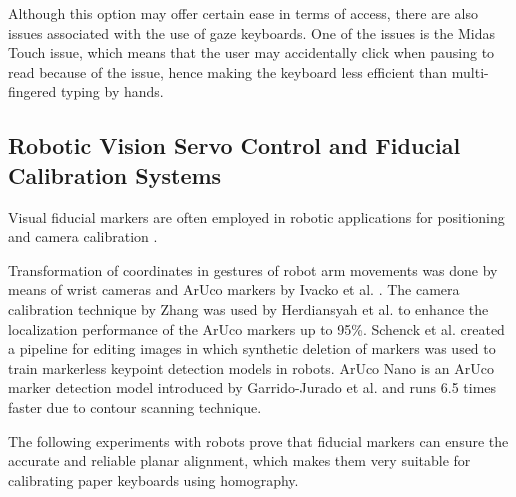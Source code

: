 Although this option may offer certain ease in terms of access, there are also issues associated with the use of gaze keyboards. One of the issues is the Midas Touch issue, which means that the user may accidentally click when pausing to read because of the issue, hence making the keyboard less efficient than multi-fingered typing by hands.

\subsection{Robotic Vision Servo Control and Fiducial Calibration Systems}
\label{subsec:lit_robotics_systems}
Visual fiducial markers are often employed in robotic applications for positioning and camera calibration \cite{Ivacko2024Edge, Herdiansyah2024Implementation, Schenck2024Utilizing, Isaksson2020Camera, Oscadal2020Improved, GarridoJurado2026ArUco}.

Transformation of coordinates in gestures of robot arm movements was done by means of wrist cameras and ArUco markers by Ivacko et al. \cite{Ivacko2024Edge}. The camera calibration technique by Zhang was used by Herdiansyah et al. \cite{Herdiansyah2024Implementation} to enhance the localization performance of the ArUco markers up to 95\%. Schenck et al. \cite{Schenck2024Utilizing} created a pipeline for editing images in which synthetic deletion of markers was used to train markerless keypoint detection models in robots. ArUco Nano is an ArUco marker detection model introduced by Garrido-Jurado et al. \cite{GarridoJurado2026ArUco} and runs 6.5 times faster due to contour scanning technique.

The following experiments with robots prove that fiducial markers can ensure the accurate and reliable planar alignment, which makes them very suitable for calibrating paper keyboards using homography.

